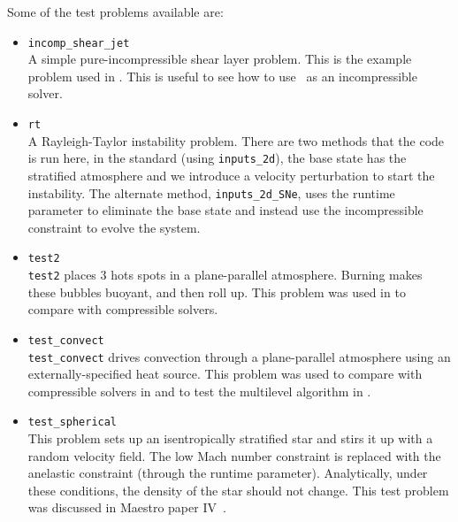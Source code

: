 Some of the test problems available are:
\begin{itemize}
\item {\tt incomp\_shear\_jet} \\[-3mm]

A simple pure-incompressible shear layer problem.  This is the example
problem used in \cite{bellcolellaglaz}.  This is useful to see how to
use \maestro\ as an incompressible solver.

\item {\tt rt} \\ [-3mm]

A Rayleigh-Taylor instability problem.  There are two methods that the
code is run here, in the standard (using {\tt inputs\_2d}), the base state
has the stratified atmosphere and we introduce a velocity perturbation
to start the instability.  The alternate method, {\tt inputs\_2d\_SNe}, uses
the  runtime parameter to eliminate the base state
and instead use the incompressible constraint to evolve the system.

\item {\tt test2} \\[-3mm]

{\tt test2} places 3 hots spots in a plane-parallel atmosphere.
Burning makes these bubbles buoyant, and then roll up.  This problem was
used in \cite{lowMach3} to compare with compressible solvers.

\item {\tt test\_convect} \\[-3mm]

{\tt test\_convect} drives convection through a plane-parallel
atmosphere using an externally-specified heat source.  This problem
was used to compare with compressible solvers in \cite{lowMach3}
and to test the multilevel algorithm in \cite{multilevel}.

\item {\tt test\_spherical} \\[-3mm]

This problem sets up an isentropically stratified star and stirs it up
with a random velocity field.  The low Mach number constraint is
replaced with the anelastic constraint (through
the  runtime parameter).  Analytically, under
these conditions, the density of the star should not change.  This
test problem was discussed in Maestro paper IV~\cite{lowMach4}.


\end{itemize}


